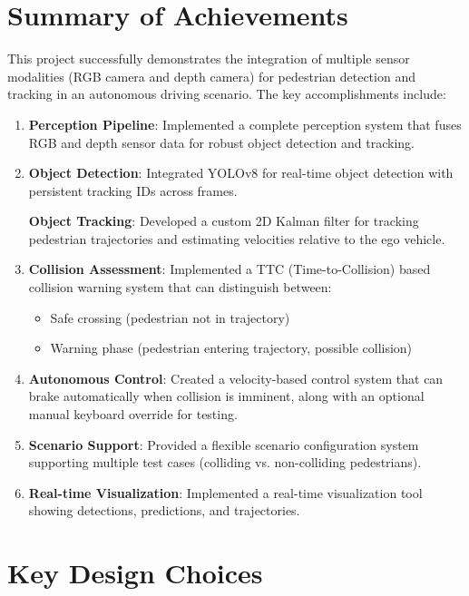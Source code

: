 \section{Summary of Achievements}

This project successfully demonstrates the integration of multiple sensor modalities (RGB camera and depth camera) for pedestrian detection and tracking in an autonomous driving scenario. The key accomplishments include:

\begin{enumerate}
    \item \textbf{Perception Pipeline}: Implemented a complete perception system that fuses RGB and depth sensor data for robust object detection and tracking.
    
    \item \textbf{Object Detection}: Integrated YOLOv8 for real-time object detection with persistent tracking IDs across frames.
    
    \textbf{Object Tracking}: Developed a custom 2D Kalman filter for tracking pedestrian trajectories and estimating velocities relative to the ego vehicle.
    
    \item \textbf{Collision Assessment}: Implemented a TTC (Time-to-Collision) based collision warning system that can distinguish between:
    \begin{itemize}
        \item Safe crossing (pedestrian not in trajectory)
        \item Warning phase (pedestrian entering trajectory, possible collision)
    \end{itemize}
    
    \item \textbf{Autonomous Control}: Created a velocity-based control system that can brake automatically when collision is imminent, along with an optional manual keyboard override for testing.
    
    \item \textbf{Scenario Support}: Provided a flexible scenario configuration system supporting multiple test cases (colliding vs. non-colliding pedestrians).
    
    \item \textbf{Real-time Visualization}: Implemented a real-time visualization tool showing detections, predictions, and trajectories.
\end{enumerate}

\section{Key Design Choices}

